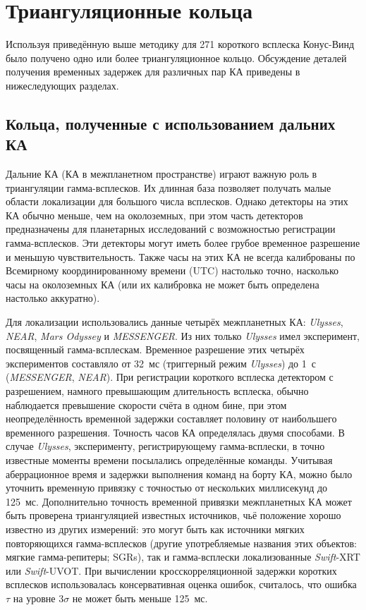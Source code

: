 \section{Триангуляционные кольца}
Используя приведённую выше методику для 271 короткого всплеска Конус-Винд было 
получено одно или более триангуляционное кольцо. Обсуждение деталей получения 
временных задержек для различных пар КА приведены в нижеследующих разделах.

\subsection{Кольца, полученные с использованием дальних КА}
Дальние КА (КА в межпланетном пространстве) играют важную роль в триангуляции 
гамма-всплесков. Их длинная база позволяет получать малые области локализации 
для большого числа всплесков. Однако детекторы на этих КА обычно меньше, чем на 
околоземных, при этом часть детекторов предназначены для планетарных исследований 
с возможностью регистрации гамма-всплесков. Эти детекторы могут иметь более 
грубое временное разрешение и меньшую чувствительность. Также часы на этих КА 
не всегда калиброваны по Всемирному координированному времени (UTC) настолько точно, 
насколько часы на околоземных КА (или их калибровка не может быть определена настолько аккуратно).

Для локализации использовались данные четырёх межпланетных КА: \textit{Ulysses}, 
\textit{NEAR}, \textit{Mars Odyssey} и \textit{MESSENGER}. Из них только \textit{Ulysses} 
имел эксперимент, посвященный гамма-всплескам. Временное разрешение этих четырёх 
экспериментов составляло от 32~мс (триггерный режим \textit{Ulysses}) 
до 1~с (\textit{MESSENGER}, \textit{NEAR}). При регистрации короткого всплеска 
детектором с разрешением, намного превышающим длительность всплеска, обычно 
наблюдается превышение скорости счёта в одном бине, при этом неопределённость 
временной задержки составляет половину от наибольшего временного разрешения. 
Точность часов КА определялась двумя способами. 
В случае \textit{Ulysses}, эксперименту, регистрирующему гамма-всплески, 
в точно известные моменты времени посылались определённые команды. 
Учитывая аберрационное время и задержки выполнения команд на борту КА, 
можно было уточнить временную привязку с точностью от нескольких миллисекунд 
до 125~мс. 
Дополнительно точность временной привязки межпланетных КА может быть проверена 
триангуляцией известных источников, чьё положение хорошо известно из других измерений: 
это могут быть как источники мягких повторяющихся гамма-всплесков 
(другие употребляемые названия этих объектов: мягкие гамма-репитеры; SGRs), 
так и гамма-всплески локализованные \textit{Swift}-XRT 
или \textit{Swift}-UVOT. При вычислении кросскорреляционной задержки коротких всплесков
использовалась консервативная оценка ошибок, считалось, 
что ошибка $\tau$ на уровне $3\sigma$ не может быть меньше 125~мс.

